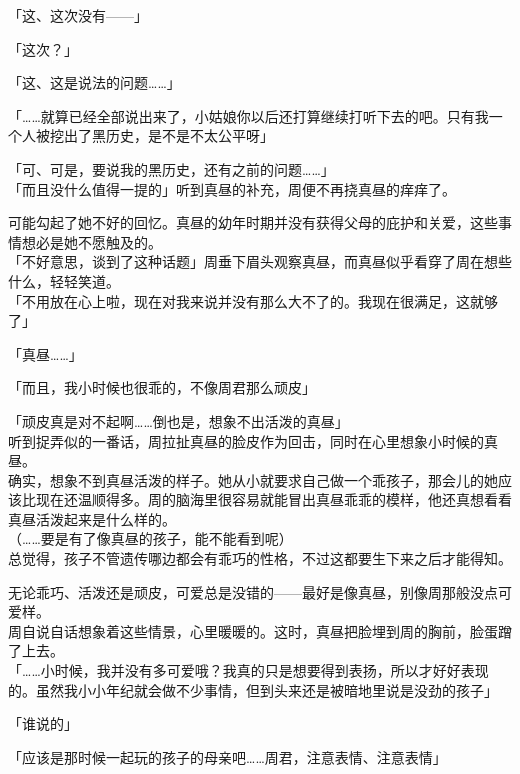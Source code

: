 「这、这次没有——」

「这次？」

「这、这是说法的问题……」

「……就算已经全部说出来了，小姑娘你以后还打算继续打听下去的吧。只有我一个人被挖出了黑历史，是不是不太公平呀」

「可、可是，要说我的黑历史，还有之前的问题……」\\

「而且没什么值得一提的」听到真昼的补充，周便不再挠真昼的痒痒了。

可能勾起了她不好的回忆。真昼的幼年时期并没有获得父母的庇护和关爱，这些事情想必是她不愿触及的。\\

「不好意思，谈到了这种话题」周垂下眉头观察真昼，而真昼似乎看穿了周在想些什么，轻轻笑道。\\

「不用放在心上啦，现在对我来说并没有那么大不了的。我现在很满足，这就够了」

「真昼……」

「而且，我小时候也很乖的，不像周君那么顽皮」

「顽皮真是对不起啊……倒也是，想象不出活泼的真昼」\\

听到捉弄似的一番话，周拉扯真昼的脸皮作为回击，同时在心里想象小时候的真昼。\\

确实，想象不到真昼活泼的样子。她从小就要求自己做一个乖孩子，那会儿的她应该比现在还温顺得多。周的脑海里很容易就能冒出真昼乖乖的模样，他还真想看看真昼活泼起来是什么样的。\\

（……要是有了像真昼的孩子，能不能看到呢）\\

总觉得，孩子不管遗传哪边都会有乖巧的性格，不过这都要生下来之后才能得知。

无论乖巧、活泼还是顽皮，可爱总是没错的——最好是像真昼，别像周那般没点可爱样。\\

周自说自话想象着这些情景，心里暖暖的。这时，真昼把脸埋到周的胸前，脸蛋蹭了上去。\\

「……小时候，我并没有多可爱哦？我真的只是想要得到表扬，所以才好好表现的。虽然我小小年纪就会做不少事情，但到头来还是被暗地里说是没劲的孩子」

「谁说的」

「应该是那时候一起玩的孩子的母亲吧……周君，注意表情、注意表情」

